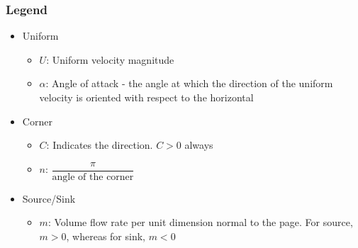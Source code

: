 \documentclass[11pt, letterpaper, notitlepage, landscape]{article}
\begin{document}
\begin{tabular}{|c|c|c|c|c|c|c|}

\hline
\end{tabular}

\subsubsection{Legend}
\begin{itemize}
  \item Uniform
  \begin{itemize}
    \item $U$: Uniform velocity magnitude
    \item $\alpha$: Angle of attack - the angle at which the direction of the uniform velocity is oriented with respect to the horizontal
  \end{itemize}
  \item Corner
  \begin{itemize}
    \item $C$: Indicates the direction. $C > 0$ always
    \item $n$: $\dfrac{\pi}{\text{angle of the corner}}$
  \end{itemize} 
  \item Source/Sink
  \begin{itemize}
    \item $m$: Volume flow rate per unit dimension normal to the page. For source, $m > 0$, whereas for sink, $m < 0$
  \end{itemize}     
\end{itemize}
\end{document}
